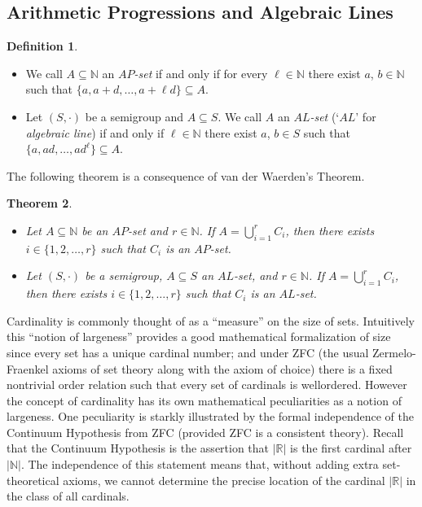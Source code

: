 \documentclass[12pt]{article}
\theoremstyle{plain}
\newtheorem{thm}{Theorem}[section]
\theoremstyle{definition}
\newtheorem{defn}[thm]{Definition}
\newcommand{\bbN}{\mathbb{N}}
\newcommand{\bbR}{\mathbb{R}}
\begin{document}
\subsection{Arithmetic Progressions and Algebraic Lines}

\begin{defn}
  \begin{itemize}
    \item[(a)] We call $A \subseteq \bbN$ an \mbox{\textsl{$AP$-set}} if and only if for every $\ell \in \bbN$ there exist $a$, $b \in \bbN$ such that $\{a, a+d, \ldots, a+\ell d \} \subseteq A$.

    \item[(b)] Let $(S, \cdot)$ be a semigroup and $A \subseteq S$.
      We call $A$ an \mbox{\textsl{$AL$-set}} (`$AL$' for \textsl{algebraic line}) if and only if $\ell \in \bbN$ there exist $a$, $b \in S$ such that $\{a, ad, \ldots, ad^\ell \} \subseteq A$.

  \end{itemize}

\end{defn}

The following theorem is a consequence of van der Waerden's Theorem.

\begin{thm}
  \begin{itemize}
    \item[(a)] Let $A \subseteq \bbN$ be an \mbox{$AP$-set} and $r \in \bbN$.
      If $A = \bigcup_{i=1}^r C_i$, then there exists $i \in \{1, 2, \ldots, r\}$ such that $C_i$ is an \mbox{$AP$-set}. 

    \item[(b)] Let $(S, \cdot)$ be a semigroup, $A \subseteq S$ an \mbox{$AL$-set}, and $r \in \bbN$. 
      If $A = \bigcup_{i=1}^r C_i$, then there exists $i \in \{1, 2, \ldots, r\}$ such that $C_i$ is an \mbox{$AL$-set}.
  \end{itemize}
\end{thm}



Cardinality is commonly thought of as a ``measure'' on the size of sets.
Intuitively this ``notion of largeness'' provides a good mathematical formalization of size since every set has a unique cardinal number; and under ZFC (the usual Zermelo-Fraenkel axioms of set theory along with the axiom of choice) there is a fixed nontrivial order relation such that every set of cardinals is wellordered.
However the concept of cardinality has its own mathematical peculiarities as a notion of largeness.
One peculiarity is starkly illustrated by the formal independence of the Continuum Hypothesis from ZFC (provided ZFC is a consistent theory).
Recall that the Continuum Hypothesis is the assertion that $|\bbR|$ is the first cardinal after $|\bbN|$.
The independence of this statement means that, without adding extra set-theoretical axioms, we cannot determine the precise location of the cardinal $|\bbR|$ in the class of all cardinals.
\end{document}

